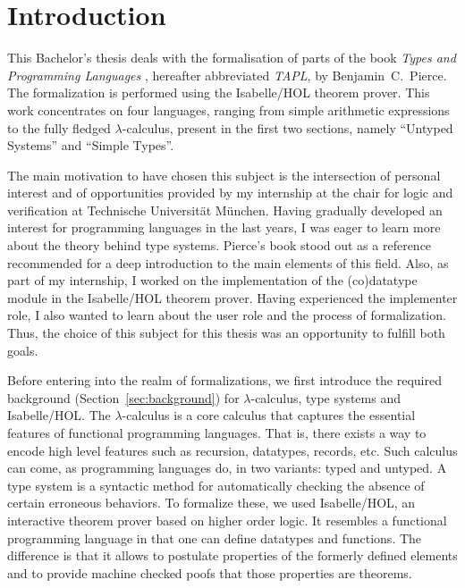 \section{Introduction}

This Bachelor's thesis deals with the formalisation of parts of the book \emph{Types and Programming
Languages} \cite{pierce-2002-TAPL}, hereafter abbreviated \emph{TAPL}, by Benjamin~C.~Pierce. The
formalization is performed using the Isabelle/HOL theorem prover. This work concentrates on four
languages, ranging from simple arithmetic expressions to the fully fledged $\lambda$-calculus,
present in the first two sections, namely ``Untyped Systems'' and ``Simple Types''.

The main motivation to have chosen this subject is the intersection of personal interest and of
opportunities provided by my internship at the chair for logic and verification at Technische
Universität München. Having gradually developed an interest for programming languages in the last
years, I was eager to learn more about the theory behind type systems. Pierce's book stood out as
a reference recommended for a deep introduction to the main elements of this field. Also, as part of
my internship, I worked on the implementation of the (co)datatype module in the Isabelle/HOL
theorem prover. Having experienced the implementer role, I also wanted to learn about the user
role and the process of formalization. Thus, the choice of this subject for this thesis was an
opportunity to fulfill both goals.

Before entering into the realm of formalizations, we first introduce the required background
(Section~\ref{sec:background}) for $\lambda$-calculus, type systems and Isabelle/HOL. The
$\lambda$-calculus is a core calculus that captures the essential features of functional programming
languages.  That is, there exists a way to encode high level features such as recursion, datatypes,
records, etc. Such calculus can come, as programming languages do, in two variants: typed and
untyped. A type system is a syntactic method for automatically checking the absence of certain
erroneous behaviors. To formalize these, we used Isabelle/HOL, an interactive theorem prover based
on higher order logic. It resembles a functional programming language in that one can define
datatypes and functions. The difference is that it allows to postulate properties of the formerly
defined elements and to provide machine checked poofs that those properties are theorems.

